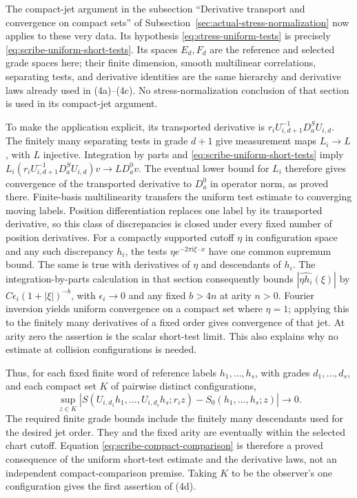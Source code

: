 The compact-jet argument in the subsection ``Derivative transport and
convergence on compact sets'' of
Subsection~\ref{sec:actual-stress-normalization} now applies to these
very data. Its hypothesis \eqref{eq:stress-uniform-tests} is precisely
\eqref{eq:scribe-uniform-short-tests}. Its spaces $E_d,F_d$ are the
reference and selected grade spaces here; their finite dimension,
smooth multilinear correlations, separating tests, and derivative
identities are the same hierarchy and derivative laws already used
in (4a)--(4c). No stress-normalization conclusion of that section is
used in its compact-jet argument.

To make the application explicit, its transported derivative is
$r_iU_{i,d+1}^{-1}D_a^S U_{i,d}$. The finitely many separating tests
in grade $d+1$ give measurement maps $L_i\to L$, with $L$ injective.
Integration by parts and \eqref{eq:scribe-uniform-short-tests} imply
$L_i(r_iU_{i,d+1}^{-1}D_a^S U_{i,d})v\to LD_a^0v$.
The eventual lower bound for $L_i$ therefore gives convergence of
the transported derivative to $D_a^0$ in operator norm, as proved
there. Finite-basis multilinearity transfers the uniform test estimate
to converging moving labels. Position differentiation replaces one
label by its transported derivative, so this class of discrepancies
is closed under every fixed number of position derivatives. For a
compactly supported cutoff $\eta$ in configuration space and any such
discrepancy $h_i$, the tests $\eta e^{-2\pi\mathrm i\xi\cdot x}$
have one common supremum bound. The same is true with derivatives of
$\eta$ and descendants of $h_i$. The integration-by-parts calculation
in that section consequently bounds
$|\widehat{\eta h_i}(\xi)|$ by
$C\epsilon_i(1+|\xi|)^{-b}$, with $\epsilon_i\to0$ and any fixed
$b>4n$ at arity $n>0$. Fourier inversion yields uniform convergence
on a compact set where $\eta=1$; applying this to the finitely many
derivatives of a fixed order gives convergence of that jet. At arity
zero the assertion is the scalar short-test limit. This also explains
why no estimate at collision configurations is needed.

Thus, for each fixed finite word of reference
labels $h_1,\ldots,h_s$, with grades $d_1,\ldots,d_s$, and each compact
set $K$ of pairwise distinct configurations,
\begin{equation}\label{eq:scribe-compact-comparison}
 \sup_{z\in K}\left|
 S(U_{i,d_1}h_1,\ldots,U_{i,d_s}h_s;r_i z)
       -S_0(h_1,\ldots,h_s;z)\right|\longrightarrow0.
\end{equation}
The required finite grade bounds include the finitely many descendants
used for the desired jet order. They and the fixed arity are eventually
within the selected chart cutoff. Equation
\eqref{eq:scribe-compact-comparison} is therefore a proved consequence
of the uniform short-test estimate and the derivative laws, not an
independent compact-comparison premise.
Taking $K$ to be the observer's one configuration gives the first
assertion of (4d).

